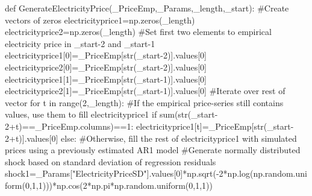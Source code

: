 \documentclass[
  letterpaper,
  DIV=11,
  numbers=noendperiod]{scrartcl}
\newenvironment{Shaded}{\begin{snugshade}}{\end{snugshade}}
\newcommand{\BuiltInTok}[1]{\textcolor[rgb]{0.00,0.23,0.31}{#1}}
\newcommand{\CommentTok}[1]{\textcolor[rgb]{0.37,0.37,0.37}{#1}}
\newcommand{\ControlFlowTok}[1]{\textcolor[rgb]{0.00,0.23,0.31}{#1}}
\newcommand{\DecValTok}[1]{\textcolor[rgb]{0.68,0.00,0.00}{#1}}
\newcommand{\KeywordTok}[1]{\textcolor[rgb]{0.00,0.23,0.31}{#1}}
\newcommand{\NormalTok}[1]{\textcolor[rgb]{0.00,0.23,0.31}{#1}}
\newcommand{\OperatorTok}[1]{\textcolor[rgb]{0.37,0.37,0.37}{#1}}
\newcommand{\StringTok}[1]{\textcolor[rgb]{0.13,0.47,0.30}{#1}}
\begin{document}
\begin{Shaded}
\begin{Highlighting}[]
\KeywordTok{def}\NormalTok{ GenerateElectricityPrice(\_PriceEmp,\_Params,\_length,\_start):}
    \CommentTok{\#Create vectors of zeros}
\NormalTok{    electricityprice1}\OperatorTok{=}\NormalTok{np.zeros(\_length)}
\NormalTok{    electricityprice2}\OperatorTok{=}\NormalTok{np.zeros(\_length)}
    \CommentTok{\#Set first two elements to empirical electricity price in \_start{-}2 and \_start{-}1}
\NormalTok{    electricityprice1[}\DecValTok{0}\NormalTok{]}\OperatorTok{=}\NormalTok{\_PriceEmp[}\BuiltInTok{str}\NormalTok{(\_start}\OperatorTok{{-}}\DecValTok{2}\NormalTok{)].values[}\DecValTok{0}\NormalTok{]}
\NormalTok{    electricityprice2[}\DecValTok{0}\NormalTok{]}\OperatorTok{=}\NormalTok{\_PriceEmp[}\BuiltInTok{str}\NormalTok{(\_start}\OperatorTok{{-}}\DecValTok{2}\NormalTok{)].values[}\DecValTok{0}\NormalTok{]}
\NormalTok{    electricityprice1[}\DecValTok{1}\NormalTok{]}\OperatorTok{=}\NormalTok{\_PriceEmp[}\BuiltInTok{str}\NormalTok{(\_start}\OperatorTok{{-}}\DecValTok{1}\NormalTok{)].values[}\DecValTok{0}\NormalTok{]}
\NormalTok{    electricityprice2[}\DecValTok{1}\NormalTok{]}\OperatorTok{=}\NormalTok{\_PriceEmp[}\BuiltInTok{str}\NormalTok{(\_start}\OperatorTok{{-}}\DecValTok{1}\NormalTok{)].values[}\DecValTok{0}\NormalTok{]}
    \CommentTok{\#Iterate over rest of vector}
    \ControlFlowTok{for}\NormalTok{ t }\KeywordTok{in} \BuiltInTok{range}\NormalTok{(}\DecValTok{2}\NormalTok{,\_length):}
        \CommentTok{\#If the empirical price{-}series still contains values, use them to fill electricityprice1}
        \ControlFlowTok{if} \BuiltInTok{sum}\NormalTok{(}\BuiltInTok{str}\NormalTok{(\_start}\OperatorTok{{-}}\DecValTok{2}\OperatorTok{+}\NormalTok{t)}\OperatorTok{==}\NormalTok{\_PriceEmp.columns)}\OperatorTok{==}\DecValTok{1}\NormalTok{:}
\NormalTok{            electricityprice1[t]}\OperatorTok{=}\NormalTok{\_PriceEmp[}\BuiltInTok{str}\NormalTok{(\_start}\OperatorTok{{-}}\DecValTok{2}\OperatorTok{+}\NormalTok{t)].values[}\DecValTok{0}\NormalTok{]}
        \ControlFlowTok{else}\NormalTok{:}
        \CommentTok{\#Otherwise, fill the rest of electricityprice1 with simulated prices using a previously estimated AR1 model}
            \CommentTok{\#Generate normally distributed shock based on standard deviation of regression residuals}
\NormalTok{            shock1}\OperatorTok{=}\NormalTok{\_Params[}\StringTok{"ElectricityPriceSD"}\NormalTok{].values[}\DecValTok{0}\NormalTok{]}\OperatorTok{*}\NormalTok{np.sqrt(}\OperatorTok{{-}}\DecValTok{2}\OperatorTok{*}\NormalTok{np.log(np.random.uniform(}\DecValTok{0}\NormalTok{,}\DecValTok{1}\NormalTok{,}\DecValTok{1}\NormalTok{)))}\OperatorTok{*}\NormalTok{np.cos(}\DecValTok{2}\OperatorTok{*}\NormalTok{np.pi}\OperatorTok{*}\NormalTok{np.random.uniform(}\DecValTok{0}\NormalTok{,}\DecValTok{1}\NormalTok{,}\DecValTok{1}\NormalTok{))}

\end{Highlighting}
\end{Shaded}
\end{document}
